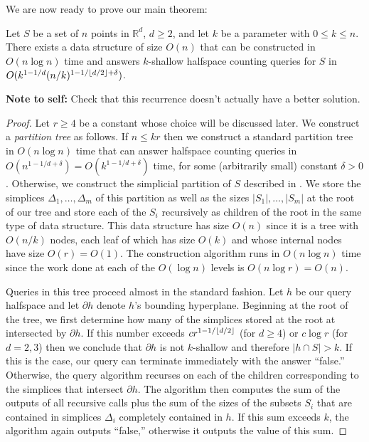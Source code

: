 \documentclass[lotsofwhite]{patmorin}
\newcommand{\X}{1-1/\floor{d/2}+\delta}
\begin{document}
We are now ready to prove our main theorem:

\begin{thm}
Let $S$ be a set of $n$ points in $\mathbb{R}^d$, $d\ge 2$, and let
$k$ be a parameter with $0\le k\le n$. There exists a data structure
of size $O(n)$ that can be constructed in $O(n\log n)$ time and
answers $k$-shallow halfspace counting queries for $S$ in
$O(k^{1-1/d}(n/k)^{\X})$.
\end{thm}
\noindent
\textbf{Note to self:} Check that this recurrence doesn't actually have
a better solution.
\begin{proof}

Let $r\ge 4$ be a constant whose choice will be discussed later.  We
construct a \emph{partition tree} \cite{X} as follows.  If $n\le kr$
then we construct a standard partition tree in $O(n\log n)$ time that
can answer halfspace counting queries in
$O(n^{1-1/d+\delta})=O(k^{1-1/d+\delta})$ time, for some (arbitrarily
small) constant $\delta>0$.  Otherwise, we construct the simplicial
partition of $S$ described in .  We store
the simplices $\Delta_1,\ldots,\Delta_m$ of this partition as well as
the sizes $|S_1|,\ldots,|S_m|$ at the root of our tree and store each
of the $S_i$ recursively as children of the root in the same type of
data structure. This data structure has size $O(n)$ since it is a tree
with $O(n/k)$ nodes, each leaf of which has size $O(k)$ and whose
internal nodes have size $O(r)=O(1)$.  The construction algorithm runs
in $O(n\log n)$ time since the work done at each of the $O(\log n)$
levels is $O(n\log r)=O(n)$.

Queries in this tree proceed almost in the standard fashion. Let $h$
be our query halfspace and let $\partial h$ denote $h$'s bounding
hyperplane.  Beginning at the root of the tree, we first determine how
many of the simplices stored at the root at intersected by $\partial
h$.  If this number exceeds $cr^{1-1/\left\lfloor d/2 \right\rfloor}$ (for $d\ge 4$) or
$c\log r$ (for $d=2,3$) then we conclude that $\partial h$ is not
$k$-shallow and therefore $|h\cap S|>k$.  If this is the case, our
query can terminate immediately with the answer ``false.''  Otherwise,
the query algorithm recurses on each of the children corresponding to
the simplices that intersect $\partial h$.  The algorithm then
computes the sum of the outputs of all recursive calls plus the sum of
the sizes of the subsets $S_i$ that are contained in simplices
$\Delta_i$ completely contained in $h$.  If this sum exceeds $k$, the
algorithm again outputs ``false,'' otherwise it outputs the value of
this sum.


\end{proof}
\end{document}
